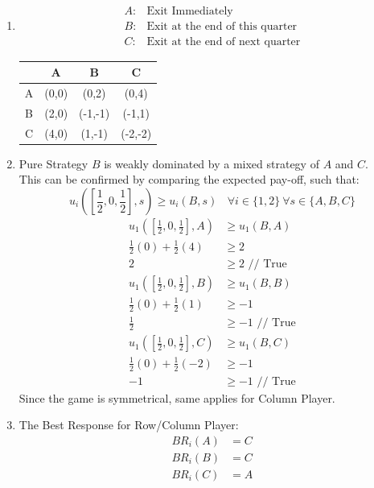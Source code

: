 \documentclass[12pt]{article}
\newenvironment{solution}[2][Solution]{\begin{trivlist}
\item[\hskip \labelsep {\bfseries #1}]}{\end{trivlist}}
\begin{document}
\begin{solution}{}~\\
\begin{enumerate}[label=(\alph*)]
\item $$\begin{array}{rl}
A: & \text{Exit Immediately}\\
B: & \text{Exit at the end of this quarter}\\
C: & \text{Exit at the end of next quarter}
\end{array}$$
\begin{center}
\begin{tabular}{| c || c | c | c |}\hline
& A & B & C \\ \hline \hline
A & (0,0) & (0,2) & (0,4) \\ \hline
B & (2,0) & (-1,-1) & (-1,1) \\ \hline
C & (4,0) & (1,-1) & (-2,-2) \\ \hline
\end{tabular}
\end{center}
\item Pure Strategy $B$ is weakly dominated by a mixed strategy of $A$ and $C$.\\
This can be confirmed by comparing the expected pay-off, such that:
$$u_i([\frac{1}{2},0,\frac{1}{2}],s)\geq u_i(B,s)\ \ \ \ \forall i\in\{1,2\}\ \forall s\in\{A,B,C\}$$
\begin{align*}
u_1([\frac{1}{2},0,\frac{1}{2}],A)&\geq u_1(B,A)\\
\frac{1}{2}(0)+\frac{1}{2}(4)&\geq2\\
2&\geq2\text{ // True}\\
u_1([\frac{1}{2},0,\frac{1}{2}],B)&\geq u_1(B,B)\\
\frac{1}{2}(0)+\frac{1}{2}(1)&\geq-1\\
\frac{1}{2}&\geq-1\text{ // True}\\
u_1([\frac{1}{2},0,\frac{1}{2}],C)&\geq u_1(B,C)\\
\frac{1}{2}(0)+\frac{1}{2}(-2)&\geq-1\\
-1&\geq-1\text{ // True}
\end{align*}
Since the game is symmetrical, same applies for Column Player.
\item The Best Response for Row/Column Player:\\
\begin{align*}
BR_i(A) &= C\\
BR_i(B) &= C\\
BR_i(C) &= A
\end{align*}

\end{enumerate}
\end{solution}
\end{document}

